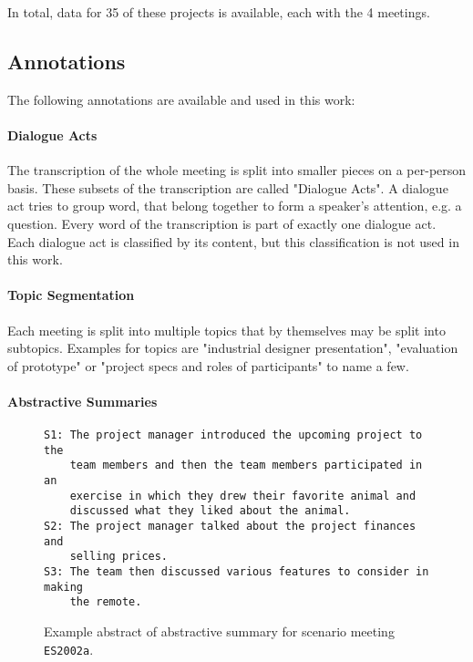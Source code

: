 In total, data for 35 of these projects is available, each with the 4 meetings. \cite[p.~2]{Mccowan05theami}

\subsection{Annotations}\label{ssec:ami-annotations}

The following annotations are available and used in this work:

\paragraph{Dialogue Acts}

The transcription of the whole meeting is split into smaller pieces on a per-person basis.
These subsets of the transcription are called "Dialogue Acts".
A dialogue act tries to group word, that belong together to form a speaker's attention, e.g. a question.
Every word of the transcription is part of exactly one dialogue act.
Each dialogue act is classified by its content, but this classification is not used in this work. \cite{amiWebsite}

\paragraph{Topic Segmentation}

Each meeting is split into multiple topics that by themselves may be split into subtopics.
Examples for topics are "industrial designer presentation", "evaluation of prototype" or "project specs and roles of
participants" to name a few. \cite{amiWebsite}

\paragraph{Abstractive Summaries}

\begin{figure}[h]
\begin{lstlisting}[numbers=none]
S1: The project manager introduced the upcoming project to the 
    team members and then the team members participated in an
    exercise in which they drew their favorite animal and
    discussed what they liked about the animal.
S2: The project manager talked about the project finances and
    selling prices.
S3: The team then discussed various features to consider in making
    the remote.
\end{lstlisting}
\caption{Example abstract of abstractive summary for scenario meeting \texttt{ES2002a}.}
\label{fig:abstractive-summary-example}
\end{figure}

